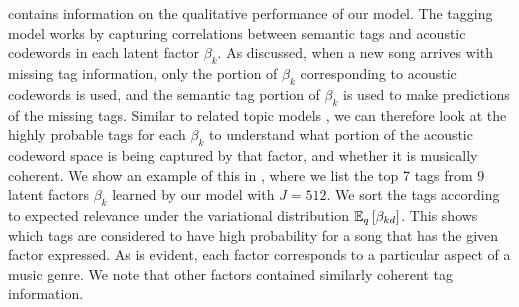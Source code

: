  contains information on the qualitative performance of our model. The tagging model works by capturing correlations between semantic tags and acoustic codewords in each latent factor $\beta_k$. As discussed, when a new song arrives with missing tag information, only the portion of $\beta_k$ corresponding to acoustic codewords is used, and the semantic tag portion of $\beta_k$ is used to make predictions of the missing tags. Similar to related topic models \citep{hoffman2013stochastic}, we can therefore look at the highly probable tags for each $\beta_k$ to understand what portion of the acoustic codeword space is being captured by that factor, and whether it is musically coherent. We show an example of this in , where we list the top 7 tags from 9 latent factors $\beta_k$ learned by our model with $J=512$. We sort the tags according to expected relevance under the variational distribution $\mathbb{E}_{q}\left[\beta_{kd}\right]$. This shows which tags are considered to have 
high probability for a song that has the given factor expressed. As is evident, each factor corresponds to a particular aspect of a music genre. We note that other factors contained similarly coherent tag information.


